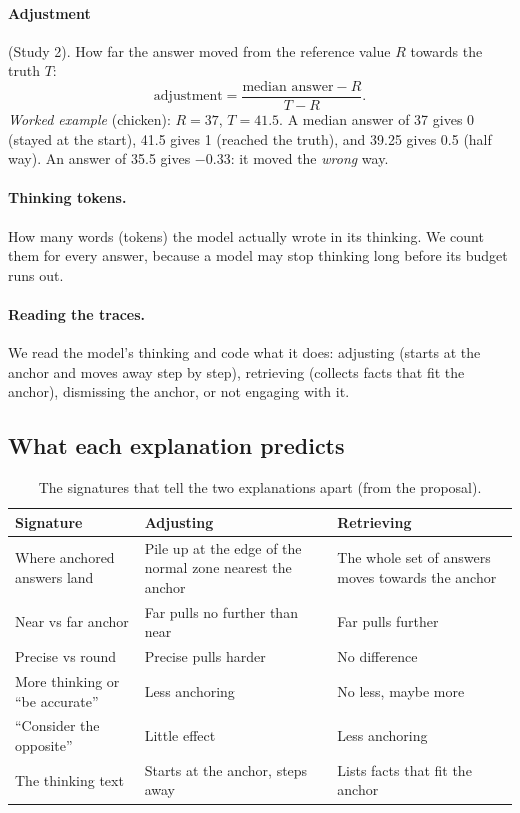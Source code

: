 \documentclass[11pt,a4paper]{article}
\begin{document}
\paragraph{Adjustment} (Study 2). How far the answer moved from the reference value $R$ towards the truth $T$:
\[
\text{adjustment} = \frac{\text{median answer} - R}{T - R}.
\]
\emph{Worked example} (chicken): $R = 37$, $T = 41.5$. A median answer of 37 gives 0 (stayed at the start), 41.5 gives 1 (reached the truth), and 39.25 gives 0.5 (half way). An answer of 35.5 gives $-0.33$: it moved the \emph{wrong} way.

\paragraph{Thinking tokens.} How many words (tokens) the model actually wrote in its thinking. We count them for every answer, because a model may stop thinking long before its budget runs out.

\paragraph{Reading the traces.} We read the model's thinking and code what it does: adjusting (starts at the anchor and moves away step by step), retrieving (collects facts that fit the anchor), dismissing the anchor, or not engaging with it.

\subsection{What each explanation predicts}

\begin{table}[ht]
\centering\small
\begin{tabularx}{\textwidth}{@{}P{3.4cm}LL@{}}
\toprule
\textbf{Signature} & \textbf{Adjusting} & \textbf{Retrieving} \\
\midrule
Where anchored answers land & Pile up at the edge of the normal zone nearest the anchor & The whole set of answers moves towards the anchor \\
Near vs far anchor & Far pulls no further than near & Far pulls further \\
Precise vs round & Precise pulls harder & No difference \\
More thinking or ``be accurate'' & Less anchoring & No less, maybe more \\
``Consider the opposite'' & Little effect & Less anchoring \\
The thinking text & Starts at the anchor, steps away & Lists facts that fit the anchor \\
\bottomrule
\end{tabularx}
\caption{The signatures that tell the two explanations apart (from the proposal).}
\label{tab:pred}
\end{table}
\end{document}
